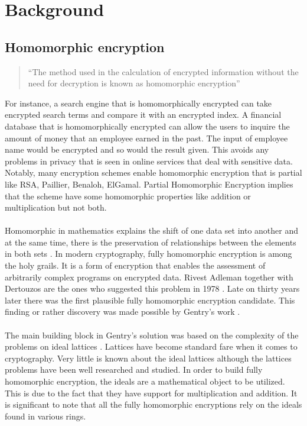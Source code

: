 \chapter{Background}

\section{Homomorphic encryption}
\begin{quotation}``The method used in the calculation of encrypted information without the need for decryption is known as homomorphic encryption'' \cite{wired2014} \end{quotation}
For instance, a search engine that is homomorphically encrypted can take encrypted search terms and compare it with an encrypted index. A financial database that is homomorphically encrypted can allow the users to inquire the amount of money that an employee earned in the past. The input of employee name would be encrypted and so would the result given. This avoids any problems in privacy that is seen in online services that deal with sensitive data. Notably, many encryption schemes enable homomorphic encryption that is partial like RSA, Paillier, Benaloh, ElGamal. Partial Homomorphic Encryption implies that the scheme have some homomorphic properties like addition or multiplication but not both. \\\\
Homomorphic in mathematics explains the shift of one data set into another and at the same time, there is the preservation of relationships between the elements in both sets \cite{tech2011}. In modern cryptography, fully homomorphic encryption is among the holy grails. It is a form of encryption that enables the assessment of arbitrarily complex programs on encrypted data\cite{brakerski2011fully}. Rivest Adleman together with Dertouzos are the ones who suggested this problem in 1978 \cite{rivest1978}. Late on thirty years later there was the first plausible fully homomorphic encryption candidate. This finding or rather discovery was made possible by Gentry's work \cite{gen09b} \cite{gen10}. \\\\
The main building block in Gentry's solution was based on the complexity of the problems on ideal lattices \cite{brakerski2011fully}. Lattices have become standard fare when it comes to cryptography. Very little is known about the ideal lattices although the lattices problems have been well researched and studied. In order to build fully homomorphic encryption, the ideals are a mathematical object to be utilized. This is due to the fact that they have support for multiplication and addition. It is significant to note that all the fully homomorphic encryptions rely on the ideals found in various rings.
